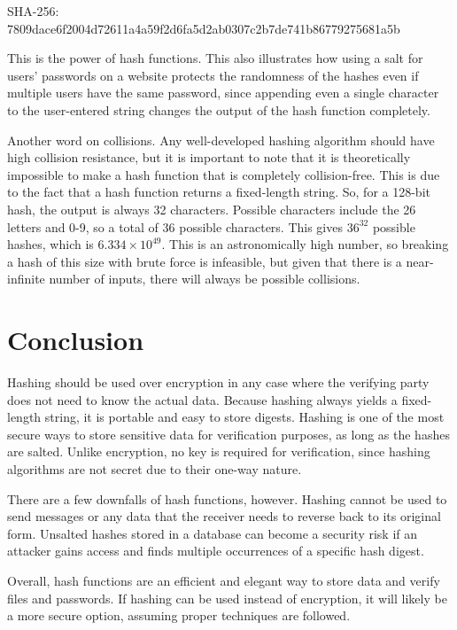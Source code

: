 \documentclass{article}
\begin{document}
SHA-256: 7809dace6f2004d72611a4a59f2d6fa5d2ab0307c2b7de741b86779275681a5b

This is the power of hash functions. This also illustrates how using a salt for users' passwords on a website protects the randomness of the hashes even if multiple users have the same password, since appending even a single character to the user-entered string changes the output of the hash function completely.

Another word on collisions. Any well-developed hashing algorithm should have high collision resistance, but it is important to note that it is theoretically impossible to make a hash function that is completely collision-free. This is due to the fact that a hash function returns a fixed-length string. So, for a 128-bit hash, the output is always 32 characters. Possible characters include the 26 letters and 0-9, so a total of 36 possible characters. This gives $36^{32}$ possible hashes, which is $6.334 \times 10^{49}$. This is an astronomically high number, so breaking a hash of this size with brute force is infeasible, but given that there is a near-infinite number of inputs, there will always be possible collisions.

\section{Conclusion}
\tab Hashing should be used over encryption in any case where the verifying party does not need to know the actual data. Because hashing always yields a fixed-length string, it is portable and easy to store digests. Hashing is one of the most secure ways to store sensitive data for verification purposes, as long as the hashes are salted. Unlike encryption, no key is required for verification, since hashing algorithms are not secret due to their one-way nature.

There are a few downfalls of hash functions, however. Hashing cannot be used to send messages or any data that the receiver needs to reverse back to its original form. Unsalted hashes stored in a database can become a security risk if an attacker gains access and finds multiple occurrences of a specific hash digest.

Overall, hash functions are an efficient and elegant way to store data and verify files and passwords. If hashing can be used instead of encryption, it will likely be a more secure option, assuming proper techniques are followed.
\end{document}

